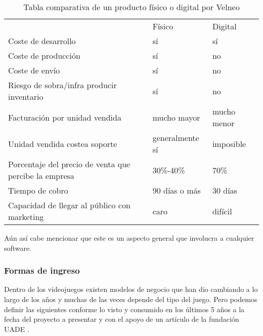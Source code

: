 \begin{table}[htbp]
	\centering
	\caption{Tabla comparativa de un producto físico o digital por Velneo \cite{velneo2015}}
	\label{fiDi}
	\begin{tabular}{lll}
		& Físico          & Digital     \\
		Coste de desarrollo                                   & sí              & sí          \\
		Coste de producción                                   & sí              & no          \\
		Coste de envío                                        & sí              & no          \\
		Riesgo de sobra/infra producir inventario             & sí              & no          \\
		Facturación por unidad vendida                        & mucho mayor     & mucho menor \\
		Unidad vendida costea soporte                         & generalmente sí & imposible   \\
		Porcentaje del precio de venta que percibe la empresa & 30\%-40\%       & 70\%        \\
		Tiempo de cobro                                       & 90 días o más   & 30 días     \\
		Capacidad de llegar al público con marketing          & caro            & difícil
	\end{tabular}
\end{table}

Aún así cabe mencionar que este es un aspecto general que involucra a cualquier software.

\subsubsection{Formas de ingreso}
Dentro de los videojuegos existen modelos de negocio que han dio cambiando a lo largo de los años y muchas de las veces depende del tipo del juego. Pero podemos definir las siguientes conforme lo visto y consumido en los últimos 5 años a la fecha del proyecto a presentar y con el apoyo de un artículo de la fundación UADE \cite{fundaciónuade2014}.

